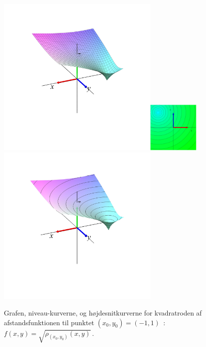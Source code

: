 \begin{figure}[h]
\centerline{\includegraphics[height=80mm]{plotSqrt.pdf}\quad \includegraphics[height=25mm]{plotSqrtNiveau.pdf} \quad \includegraphics[height=80mm]{plotSqrtNiveauUP.pdf}}
\begin{center}
\caption{Grafen, niveau-kurverne, og højdesnitkurverne  for kvadratroden af afstandsfunktionen til punktet $(x_{0}, y_{0}) = (-1,1)$\, : \, $f(x, y) = \sqrt{\rho_{(x_{0}, y_{0})}(x,y)}\,$. } \label{figSqrt}
\end{center}
\end{figure}




